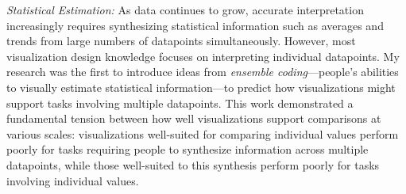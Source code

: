 \documentclass[11pt]{article}
\begin{document}

\emph{Statistical Estimation: }As data continues to grow, accurate interpretation increasingly requires synthesizing 
statistical information such as averages and trends from large numbers of datapoints simultaneously.
However, most visualization design knowledge focuses on interpreting individual datapoints.
My research was the first to introduce ideas from \emph{ensemble coding}---people's abilities to visually estimate statistical information---to predict how visualizations might support tasks involving multiple datapoints. 
This work demonstrated a fundamental tension between how well visualizations support comparisons at various scales: visualizations well-suited for comparing individual values perform poorly for tasks requiring people to synthesize information across multiple datapoints, while those well-suited to this synthesis perform poorly for tasks involving individual values. 
\end{document}
